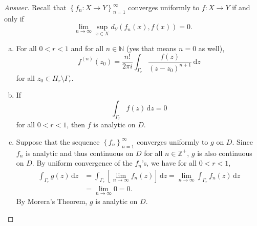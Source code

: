 \documentclass[12pt]{article}
\newcommand{\n}{\mathbb{N}}
\newcommand{\z}{\mathbb{Z}}
\newcommand\paren[1]{\left( #1 \right)}
\newcommand\setb[1]{\left \{ #1 \right \}}
\newcommand{\sqbrack}[1]{\left [ #1 \right ]}
\theoremstyle{definition}
\begin{document}
\begin{proof}[Answer]
    Recall that $\setb{f_n : X \to Y}_{n=1}^{\infty}$ converges uniformly to $f : X \to Y$ if and only if 
    \[
        \lim\limits_{n \to \infty} \sup\limits_{x \in X} d_Y \paren{ f_n(x) , f(x)  } = 0.
    \]
    \begin{enumerate}[a.]
        \item For all $0 < r < 1$ and for all $n \in \n$ (yes that means $n = 0$ as well),
        \[
            f^{(n)}(z_0) = \frac{n!}{2\pi i} \int_{\Gamma_r} \frac{f(z)}{ \paren{ z - z_0 }^{n+1} } \, \mathrm{d}z
        \]
        for all $z_0 \in H_r \setminus \Gamma_r$. 
        \item If 
        \[
            \int_{\Gamma_r} f(z) \, \mathrm{d}z = 0
        \]
        for all $0 < r < 1$, then $f$ is analytic on $D$.
        \item Suppose that the sequence $\setb{ f_n }_{n=1}^{\infty}$ converges uniformly to $g$ on $D$. Since $f_n$ is analytic and thus continuous on $D$ for all $n \in \z^+$, $g$ is also continuous on $D$. By uniform convergence of the $f_n$'s, we have for all $0 < r < 1$,
        \begin{align*}
            \int_{\Gamma_r} g(z) \, \mathrm{d}z & = \int_{\Gamma_r} \sqbrack {\lim\limits_{n \to \infty} f_n(z) } \, \mathrm{d}z = \lim\limits_{n \to \infty} \int_{\Gamma_r} f_n(z) \, \mathrm{d}z \\
            & = \lim\limits_{n \to \infty} 0 = 0.
        \end{align*}
        By Morera's Theorem, $g$ is analytic on $D$. 
        

\end{enumerate}
\end{proof}
\end{document}
